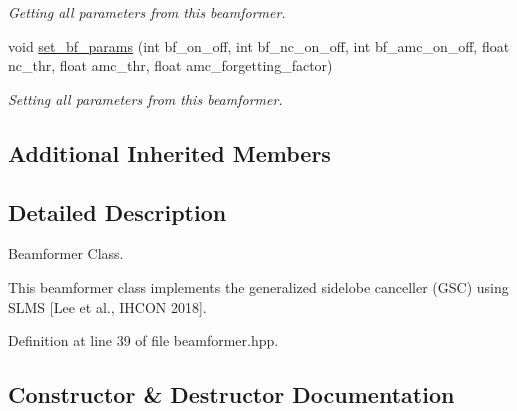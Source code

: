 \begin{DoxyCompactItemize}
\begin{DoxyCompactList}\small\item\em Getting all parameters from this beamformer. \end{DoxyCompactList}\item 
void \hyperlink{classbeamformer_ac608a617588757dba3ac80c88a3d3c70}{set\+\_\+bf\+\_\+params} (int bf\+\_\+on\+\_\+off, int bf\+\_\+nc\+\_\+on\+\_\+off, int bf\+\_\+amc\+\_\+on\+\_\+off, float nc\+\_\+thr, float amc\+\_\+thr, float amc\+\_\+forgetting\+\_\+factor)
\begin{DoxyCompactList}\small\item\em Setting all parameters from this beamformer. \end{DoxyCompactList}\end{DoxyCompactItemize}
\subsection*{Additional Inherited Members}


\subsection{Detailed Description}
Beamformer Class. 

This beamformer class implements the generalized sidelobe canceller (G\+SC) using S\+L\+MS \mbox{[}Lee et al., I\+H\+C\+ON 2018\mbox{]}. 

Definition at line 39 of file beamformer.\+hpp.



\subsection{Constructor \& Destructor Documentation}
\mbox{\label{classbeamformer_a30c14263a887cada41e51dffd39991c8}} 
